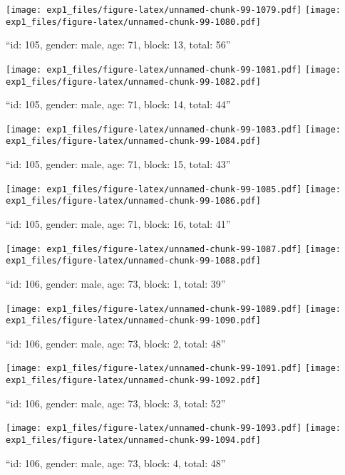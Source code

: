 \documentclass[,]{article}
\begin{document}
\texttt{[image: exp1\_files/figure-latex/unnamed-chunk-99-1079.pdf]}
\texttt{[image: exp1\_files/figure-latex/unnamed-chunk-99-1080.pdf]}

\newpage
[1] 

``id: 105, gender: male, age: 71, block: 13, total: 56''

\texttt{[image: exp1\_files/figure-latex/unnamed-chunk-99-1081.pdf]}
\texttt{[image: exp1\_files/figure-latex/unnamed-chunk-99-1082.pdf]}

\newpage
[1] 

``id: 105, gender: male, age: 71, block: 14, total: 44''

\texttt{[image: exp1\_files/figure-latex/unnamed-chunk-99-1083.pdf]}
\texttt{[image: exp1\_files/figure-latex/unnamed-chunk-99-1084.pdf]}

\newpage
[1] 

``id: 105, gender: male, age: 71, block: 15, total: 43''

\texttt{[image: exp1\_files/figure-latex/unnamed-chunk-99-1085.pdf]}
\texttt{[image: exp1\_files/figure-latex/unnamed-chunk-99-1086.pdf]}

\newpage
[1] 

``id: 105, gender: male, age: 71, block: 16, total: 41''

\texttt{[image: exp1\_files/figure-latex/unnamed-chunk-99-1087.pdf]}
\texttt{[image: exp1\_files/figure-latex/unnamed-chunk-99-1088.pdf]}

\newpage
[1] 

``id: 106, gender: male, age: 73, block: 1, total: 39''

\texttt{[image: exp1\_files/figure-latex/unnamed-chunk-99-1089.pdf]}
\texttt{[image: exp1\_files/figure-latex/unnamed-chunk-99-1090.pdf]}

\newpage
[1] 

``id: 106, gender: male, age: 73, block: 2, total: 48''

\texttt{[image: exp1\_files/figure-latex/unnamed-chunk-99-1091.pdf]}
\texttt{[image: exp1\_files/figure-latex/unnamed-chunk-99-1092.pdf]}

\newpage
[1] 

``id: 106, gender: male, age: 73, block: 3, total: 52''

\texttt{[image: exp1\_files/figure-latex/unnamed-chunk-99-1093.pdf]}
\texttt{[image: exp1\_files/figure-latex/unnamed-chunk-99-1094.pdf]}

\newpage
[1] 

``id: 106, gender: male, age: 73, block: 4, total: 48''
\end{document}
